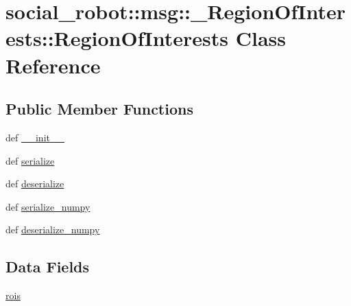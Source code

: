\hypertarget{classsocial__robot_1_1msg_1_1__RegionOfInterests_1_1RegionOfInterests}{
\section{social\_\-robot::msg::\_\-RegionOfInterests::RegionOfInterests Class Reference}
\label{classsocial__robot_1_1msg_1_1__RegionOfInterests_1_1RegionOfInterests}
}
\subsection*{Public Member Functions}
\begin{DoxyCompactItemize}
\item 
def \hyperlink{classsocial__robot_1_1msg_1_1__RegionOfInterests_1_1RegionOfInterests_a2db171c12bf93b29f41111a5ff1c2fc8}{\_\-\_\-init\_\-\_\-}
\item 
def \hyperlink{classsocial__robot_1_1msg_1_1__RegionOfInterests_1_1RegionOfInterests_abb6d0b069ff1727aec6ded395d171a77}{serialize}
\item 
def \hyperlink{classsocial__robot_1_1msg_1_1__RegionOfInterests_1_1RegionOfInterests_a5991036e5324683608a95d0ffad57a0c}{deserialize}
\item 
def \hyperlink{classsocial__robot_1_1msg_1_1__RegionOfInterests_1_1RegionOfInterests_aa464213af4d39dd2ad1c1d52f91ea3a2}{serialize\_\-numpy}
\item 
def \hyperlink{classsocial__robot_1_1msg_1_1__RegionOfInterests_1_1RegionOfInterests_a6d25339da85ed702e19e3ccdeb88d360}{deserialize\_\-numpy}
\end{DoxyCompactItemize}
\subsection*{Data Fields}
\begin{DoxyCompactItemize}
\item 
\hyperlink{classsocial__robot_1_1msg_1_1__RegionOfInterests_1_1RegionOfInterests_a89d94e67422a005c044977474b332fef}{rois}
\end{DoxyCompactItemize}



